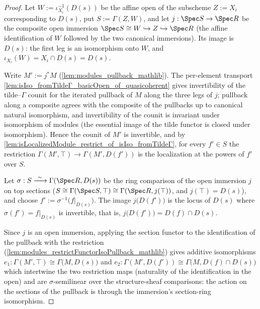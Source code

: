 \begin{proof}
  \leanok
  Let \(W := \iota_{X_i}^{-1}(D(s))\) be the affine open of the subscheme \(Z := X_i\)
  corresponding to \(D(s)\), put \(S := \Gamma(Z, W)\), and let
  \(j : \Spec S \to \Spec R\) be the composite open immersion
  \(\Spec S \cong W \hookrightarrow Z \hookrightarrow \Spec R\) (the affine
  identification of \(W\) followed by the two canonical immersions). Its image is
  \(D(s)\): the first leg is an isomorphism onto \(W\), and
  \(\iota_{X_i}(W) = X_i \cap D(s) = D(s)\).

  Write \(M' := j^{*} M\) (\cref{lem:modules_pullback_mathlib}). The per-element
  transport \cref{lem:isIso_fromTildeΓ_basicOpen_of_quasicoherent} gives invertibility of
  the tilde--\(\Gamma\) counit for the iterated pullback of \(M\) along the three legs of
  \(j\); pullback along a composite agrees with the composite of the pullbacks up to
  canonical natural isomorphism, and invertibility of the counit is invariant under
  isomorphism of modules (the essential image of the tilde functor is closed under
  isomorphism). Hence the counit of \(M'\) is invertible, and by
  \cref{lem:isLocalizedModule_restrict_of_isIso_fromTildeΓ}, for every \(f' \in S\) the
  restriction \(\Gamma(M', \top) \to \Gamma(M', D(f'))\) is the localization at the
  powers of \(f'\) over \(S\).

  Let \(\sigma : S \xrightarrow{\ \sim\ } \Gamma(\Spec R, D(s))\) be the ring comparison
  of the open immersion \(j\) on top sections
  (\(S \cong \Gamma(\Spec S, \top) \cong \Gamma(\Spec R, j(\top))\), and
  \(j(\top) = D(s)\)), and choose \(f' := \sigma^{-1}\bigl(f|_{D(s)}\bigr)\). The image
  \(j\bigl(D(f')\bigr)\) is the locus of \(D(s)\) where \(\sigma(f') = f|_{D(s)}\) is
  invertible, that is, \(j\bigl(D(f')\bigr) = D(f) \cap D(s)\).

  Since \(j\) is an open immersion, applying the section functor to the identification of
  the pullback with the restriction (\cref{lem:modules_restrictFunctorIsoPullback_mathlib})
  gives additive isomorphisms
  \(e_1 : \Gamma(M', \top) \cong \Gamma\bigl(M, D(s)\bigr)\) and
  \(e_2 : \Gamma(M', D(f')) \cong \Gamma\bigl(M, D(f) \cap D(s)\bigr)\) which intertwine
  the two restriction maps (naturality of the identification in the open) and are
  \(\sigma\)-semilinear over the structure-sheaf comparisons: the action on the sections
  of the pullback is through the immersion's section-ring isomorphism.


\end{proof}
